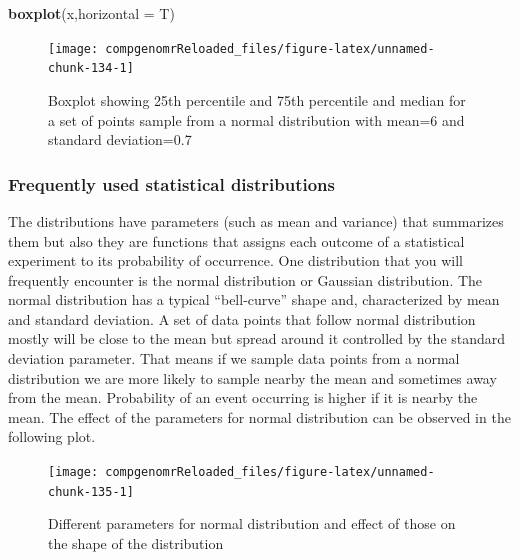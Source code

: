\documentclass[12pt,]{krantz}
\newenvironment{Shaded}{\begin{snugshade}}{\end{snugshade}}
\newcommand{\DataTypeTok}[1]{\textcolor[rgb]{0.13,0.29,0.53}{#1}}
\newcommand{\KeywordTok}[1]{\textcolor[rgb]{0.13,0.29,0.53}{\textbf{#1}}}
\newcommand{\NormalTok}[1]{#1}
\theoremstyle{definition}
\theoremstyle{definition}
\theoremstyle{definition}
\theoremstyle{remark}
\begin{document}
\begin{Shaded}
\begin{Highlighting}[]
\KeywordTok{boxplot}\NormalTok{(x,}\DataTypeTok{horizontal =}\NormalTok{ T)}
\end{Highlighting}
\end{Shaded}

\begin{figure}

{\centering \texttt{[image: compgenomrReloaded\_files/figure-latex/unnamed-chunk-134-1]} 

}

\caption{Boxplot showing 25th percentile and 75th percentile and median for a set of points sample from a normal distribution with mean=6 and standard deviation=0.7}\label{fig:unnamed-chunk-134}
\end{figure}

\hypertarget{frequently-used-statistical-distributions}{%
\subsubsection{Frequently used statistical
distributions}\label{frequently-used-statistical-distributions}}

The distributions have parameters (such as mean and variance) that
summarizes them but also they are functions that assigns each outcome of
a statistical experiment to its probability of occurrence. One
distribution that you will frequently encounter is the normal
distribution or Gaussian distribution. The normal distribution has a
typical ``bell-curve'' shape and, characterized by mean and standard
deviation. A set of data points that follow normal distribution mostly
will be close to the mean but spread around it controlled by the
standard deviation parameter. That means if we sample data points from a
normal distribution we are more likely to sample nearby the mean and
sometimes away from the mean. Probability of an event occurring is
higher if it is nearby the mean. The effect of the parameters for normal
distribution can be observed in the following plot.

\begin{figure}

{\centering \texttt{[image: compgenomrReloaded\_files/figure-latex/unnamed-chunk-135-1]} 

}

\caption{Different parameters for normal distribution and effect of those on the shape of the distribution}\label{fig:unnamed-chunk-135}
\end{figure}
\end{document}
